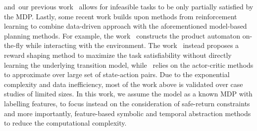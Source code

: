 and~our previous work~\cite{guo2018probabilistic} allows for infeasible tasks to be only partially satisfied by the MDP.
Lastly, some recent work builds upon methods from reinforcement learning to combine data-driven approach with the aforementioned model-based planning methods.
For example, the work~\cite{hasanbeig2019reinforcement}  constructs the product automaton on-the-fly while interacting with the environment.
The work~\cite{bozkurt2020control} instead proposes a reward shaping method to maximize the task satisfiability without directly learning the underlying transition model,
while~\cite{wang2015temporal} relies on the actor-critic methods to approximate over large set of state-action pairs.
Due to the exponential complexity and data inefficiency,
most of the work above is validated over case studies of limited sizes.
{In this work, we assume the model as a known MDP with labelling features,
to focus instead on the consideration of safe-return constraints
and more importantly, feature-based symbolic and temporal abstraction methods
to reduce the computational complexity.}


